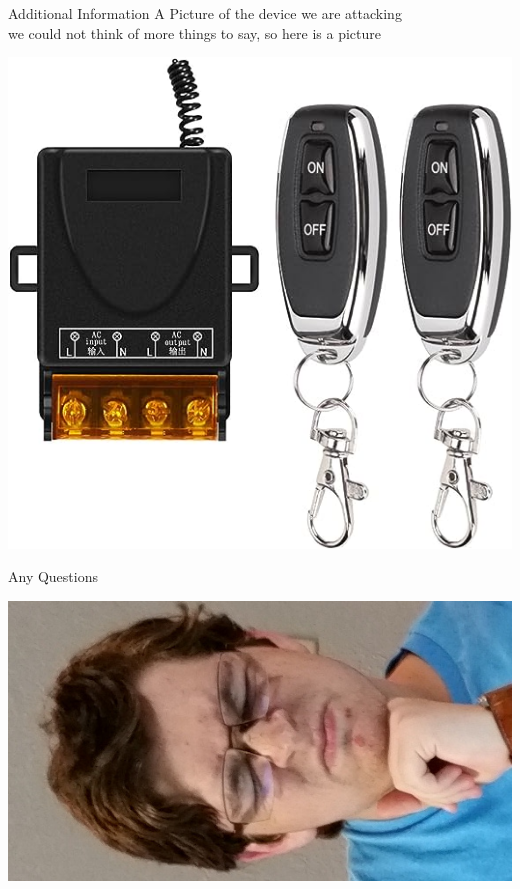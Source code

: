 \documentclass{beamer}
\begin{document}
\begin{frame}{Additional Information}
A Picture of the device we are attacking\\
we could not think of more things to say, so here is a picture

\begin{center}
    \includegraphics[width=0.6\linewidth]{./img/device.jpg}
\end{center}

\end{frame}


\begin{frame}{Any Questions}

\begin{center}
    \includegraphics[width=1\linewidth]{./img/funny.jpg}
\end{center}

\end{frame}
\end{document}
